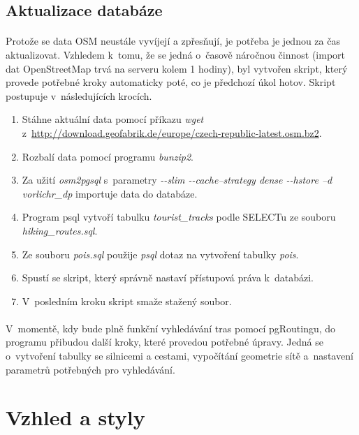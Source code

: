 \documentclass[11pt,a4paper,titlepage,oneside]{book}
\begin{document}
			\subsection{Aktualizace databáze}
				\paragraph{} Protože se data \acl{OSM} neustále vyvíjejí a zpřesňují, je potřeba je jednou za čas aktualizovat. Vzhledem k~tomu, že se jedná o~časově náročnou činnost (import dat OpenStreetMap trvá na serveru kolem 1 hodiny), byl vytvořen skript, který provede potřebné kroky automaticky poté, co je předchozí úkol hotov. Skript postupuje v~následujících krocích.
		\begin{enumerate}
			\item Stáhne aktuální data pomocí příkazu \textit{wget} \newline z~\url{http://download.geofabrik.de/europe/czech-republic-latest.osm.bz2}.
			\item Rozbalí data pomocí programu \textit{bunzip2}.
			\item Za užití \textit{osm2pgsql} s~parametry \textit{ -\--slim  -\--cache--strategy dense -\--hstore --d vorlichr\_dp} importuje data do databáze.
			\item Program psql vytvoří tabulku \textit{tourist\_tracks} podle SELECTu ze souboru \textit{hiking\_routes.sql}.
			\item Ze souboru \textit{pois.sql} použije \textit{psql} dotaz na vytvoření tabulky \textit{pois}.
			\item Spustí se skript, který správně nastaví přístupová práva k~databázi.
			\item V~posledním kroku skript smaže stažený soubor.
		\end{enumerate}
			\paragraph{} V~momentě, kdy bude plně funkční vyhledávání tras pomocí pgRoutingu, do programu přibudou další kroky, které provedou potřebné úpravy. Jedná se o~vytvoření tabulky se silnicemi a cestami, vypočítání geometrie sítě a~nastavení parametrů potřebných pro vyhledávání.

		\section{Vzhled a styly}

\end{document}
